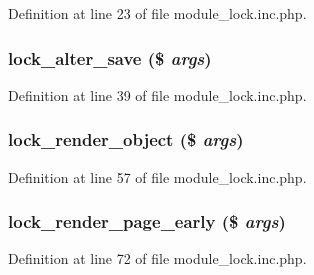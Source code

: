 Definition at line 23 of file module\_\-lock.inc.php.

\hypertarget{module__lock_8inc_8php_a020e43e0402fa42f7bf8e6abc37b54d6}{
\subsubsection[{lock\_\-alter\_\-save}]{\setlength{\rightskip}{0pt plus 5cm}lock\_\-alter\_\-save (\$ {\em args})}}
\label{module__lock_8inc_8php_a020e43e0402fa42f7bf8e6abc37b54d6}


Definition at line 39 of file module\_\-lock.inc.php.

\hypertarget{module__lock_8inc_8php_a3a44bd42a5f48e026bfd3c7464b23d6a}{
\subsubsection[{lock\_\-render\_\-object}]{\setlength{\rightskip}{0pt plus 5cm}lock\_\-render\_\-object (\$ {\em args})}}
\label{module__lock_8inc_8php_a3a44bd42a5f48e026bfd3c7464b23d6a}


Definition at line 57 of file module\_\-lock.inc.php.

\hypertarget{module__lock_8inc_8php_a4a02b69bbe021a39c825e30035902b29}{
\subsubsection[{lock\_\-render\_\-page\_\-early}]{\setlength{\rightskip}{0pt plus 5cm}lock\_\-render\_\-page\_\-early (\$ {\em args})}}
\label{module__lock_8inc_8php_a4a02b69bbe021a39c825e30035902b29}


Definition at line 72 of file module\_\-lock.inc.php.

